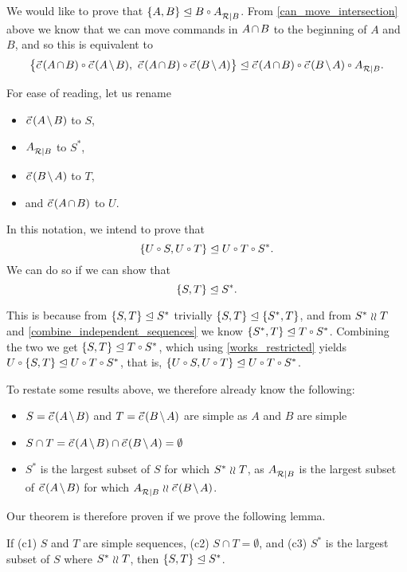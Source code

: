 We would like to prove that $\worksmbx{A,B}{B\cc \reca}$.
From \cref{can_move_intersection} above we know that we can move commands in $\acbnp$
to the beginning of $A$ and $B$, and so this is equivalent to
\[ \worksm{\big\{\acb\cc\amb,~ \acb\cc\bma\big\}}{\acb\cc \bma\cc \reca}. \]

For ease of reading, let us rename
\begin{itemize}
\item $\amb$ to $S$,
\item ${A}^{}_{\mathcal{R}|{B}}$ to $S^*$,
\item $\bma$ to $T$,
\item and $\acb$ to $U$.
\end{itemize}
In this notation, we intend to prove that
\[ \worksmbx{U\cc S,U\cc T}{U\cc T\cc S^*}. \]
We can do so if we can show that
\[ {\{{S,T}\}}\trianglelefteq{S^*}. \]

This is because from ${\{{S,T}\}}\trianglelefteq{S^*}$ trivially ${\{{S,T}\}}\trianglelefteq{\{{S^*, T}\}}$,
and from $S^* \mathrel{\wr\wr} T$ and \cref{combine_independent_sequences} we know 
$\worksmbx{S^*,T}{T\cc S^*}$.
Combining the two we get $\worksmbx{S,T}{T\cc S^*}$,
which using \cref{works_restricted} yields
$\worksm{U\cc\{S,T\}}{U\cc T\cc S^*}$, that is,
$\worksmbx{U\cc S,U\cc T}{U\cc T\cc S^*}$.

To restate some results above, we therefore already know the following:
\begin{itemize}
\item $S=\amb$ and $T=\bma$ are simple as $A$ and $B$ are simple
\item $S\cap T = \amb \cap \bma = \emptyset$
\item $S^*$ is the largest subset of $S$ for which $S^*\mathrel{\wr\wr} T$, as
${A}^{}_{\mathcal{R}|{B}}$ is the largest subset of $\amb$ for which $\reca\indep\bma$.
\end{itemize}
Our theorem is therefore proven if we prove the following lemma.
\newcommand{\condSimple}{(c1)}
\newcommand{\condDisj}{(c2)}
\newcommand{\condApr}{(c3)}
\begin{mylem}
If
{\condSimple} $S$ and $T$ are simple sequences,
{\condDisj} $S\cap T=\emptyset$,
and {\condApr} $S^*$ is the largest subset of $S$ where $S^*\mathrel{\wr\wr} T$,
then
${\{{S,T}\}}\trianglelefteq{S^*}$.
\end{mylem}

